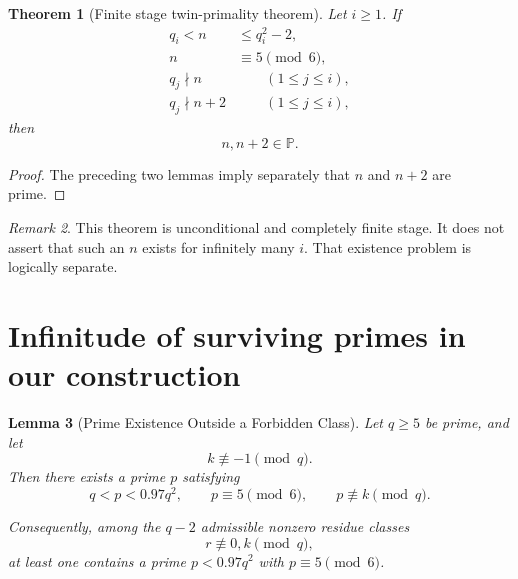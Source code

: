 \documentclass[11pt,a4paper]{article}
\newtheorem{theorem}{Theorem}[section]
\newtheorem{lemma}[theorem]{Lemma}
\theoremstyle{definition}
\theoremstyle{remark}
\newtheorem{remark}[theorem]{Remark}
\newcommand{\PP}{\mathbb{P}}
\begin{document}
\begin{theorem}[Finite stage twin-primality theorem]
Let $i\ge1$.  If
\[
\begin{aligned}
q_i<n&\le q_i^2-2,\\
n&\equiv5\pmod6,\\
q_j\nmid n&\qquad(1\le j\le i),\\
q_j\nmid n+2&\qquad(1\le j\le i),
\end{aligned}
\]
then
\[
    \boxed{n,n+2\in\PP.}
\]
\end{theorem}

\begin{proof}
The preceding two lemmas imply separately that $n$ and $n+2$ are
prime.
\end{proof}

\begin{remark}
This theorem is unconditional and completely finite stage.  It does
not assert that such an $n$ exists for infinitely many $i$.  That
existence problem is logically separate.
\end{remark}

\section{Infinitude of surviving primes in our construction}

\begin{lemma}[Prime Existence Outside a Forbidden Class]
Let $q\geq5$ be prime, and let
\[
    k\not\equiv -1\pmod q.
\]
Then there exists a prime $p$ satisfying
\[
    q<p<0.97q^2,
    \qquad
    p\equiv5\pmod6,
    \qquad
    p\not\equiv k\pmod q.
\]

\noindent Consequently, among the $q-2$ admissible nonzero residue classes
\[
    r\not\equiv0,k\pmod q,
\]
at least one contains a prime $p<0.97q^2$ with
$p\equiv5\pmod6$.
\end{lemma}
\end{document}
